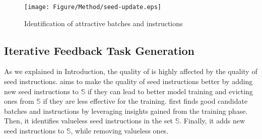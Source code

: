 \begin{figure}[t]
    \centering
    \texttt{[image: Figure/Method/seed-update.eps]}
    \caption{Identification of attractive batches and instructions}
    \label{fig:seed-update}
\end{figure}




\subsection{Iterative Feedback Task Generation}

As we explained in Introduction,
the quality of \ours{} is highly affected by the quality of seed instructions.
\ours{} aims to make the quality of seed instructions better 
by adding new seed instructions to $\mathbb{S}$ if they can lead to better model training and
evicting ones from $\mathbb{S}$ if they are less effective for the training.
\ours{} first finds good candidate batches and instructions 
by leveraging insights gained from the training phase.
Then, it identifies valueless seed instructions in the set $\mathbb{S}$.
Finally, it adds new seed instructions to $\mathbb{S}$, while
removing valueless ones.

\begin{comment}
\cancel{
Few-shot learning is a method in which a few samples are provided to an LLM when
performing a new task. The quality of this method is based on the example's
quality. Therefore, \ours{} attempts to enhance the quality of these examples, 
which is the seed instructions.
More specifically, we aim to make the quality of instructions in
the seed instructions better by including
seed instructions that can lead to better model training and
evicting what is less effective.
To achieve this, we pipeline the instruction generation
and training processes, leveraging insights gained during training to improve the
quality of instructions generated through few-shot learning.
}
\end{comment}



